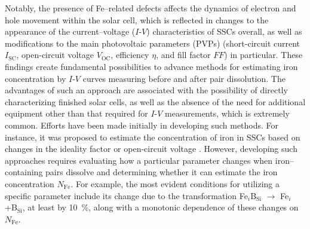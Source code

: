 \documentclass[a4paper,fleqn]{cas-sc}
\begin{document}
Notably, the presence of Fe--related defects affects the dynamics of electron and hole movement within the solar cell,
which is reflected in changes to the appearance of the current--voltage ($I$-$V$) characteristics of SSCs overall,
as well as modifications to the main photovoltaic parameters (PVPs)
(short-circuit current  $I_\mathrm{SC}$,
open-circuit voltage $V_\mathrm{OC}$,
efficiency $\eta$, and fill factor $F\!F$)
in particular.
These findings create fundamental possibilities to advance methods for estimating iron concentration by $I$-$V$ curves measuring before and after pair dissolution.
The advantages of such an approach are associated with the possibility of directly characterizing finished solar cells,
as well as the absence of the need for additional equipment other than that required for $I$-$V$ measurements, which is extremely common.
Efforts have been made initially in developing such methods.
For instance, it was proposed to estimate the concentration of iron in SSCs based on changes in the ideality factor \cite{Olikh2019SM,Olikh2022PPV}
or open-circuit voltage \cite{Herguth2022}.
However, developing such approaches requires evaluating how a particular parameter changes when iron--containing pairs dissolve
and determining whether it can estimate the iron concentration $N_\mathrm{Fe}$.
For example, the most evident conditions for utilizing a specific parameter include its change due to the transformation
Fe$_i$B$_\mathrm{Si}$ $\rightarrow$ Fe$_i$ +B$_\mathrm{Si}$,
at least by 10~\%, along with a monotonic dependence of these changes on $N_\mathrm{Fe}$.
\end{document}
